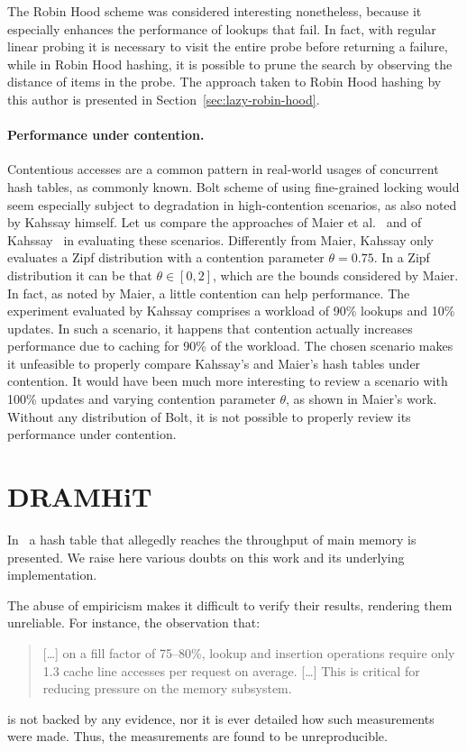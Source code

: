 The Robin Hood scheme was considered interesting nonetheless, because it especially enhances the performance of lookups that fail.
In fact, with regular linear probing it is necessary to visit the entire probe before returning a failure, while in Robin Hood hashing, it is possible to prune the search by observing the distance of items in the probe.
The approach taken to Robin Hood hashing by this author is presented in Section~\ref{sec:lazy-robin-hood}.

\paragraph{Performance under contention.}
Contentious accesses are a common pattern in real-world usages of concurrent hash tables, as commonly known.
Bolt scheme of using fine-grained locking would seem especially subject to degradation in high-contention scenarios, as also noted by Kahssay himself.
Let us compare the approaches of Maier et al.\ \cite[\S8.4, ``Performance under contention'']{maier} and of Kahssay~\cite[\S7.4]{bolt} in evaluating these scenarios.
Differently from Maier, Kahssay only evaluates a Zipf distribution with a contention parameter $\theta = 0.75$.
In a Zipf distribution it can be that $\theta \in [0, 2]$, which are the bounds considered by Maier.
In fact, as noted by Maier, a little contention can help performance.
The experiment evaluated by Kahssay comprises a workload of 90\% lookups and 10\% updates.
In such a scenario, it happens that contention actually increases performance due to caching for 90\% of the workload.
The chosen scenario makes it unfeasible to properly compare Kahssay's and Maier's hash tables under contention.
It would have been much more interesting to review a scenario with 100\% updates and varying contention parameter $\theta$, as shown in Maier's work.
Without any distribution of Bolt, it is not possible to properly review its performance under contention.


\section{DRAMHiT}\label{sec:dramhit}

In~\cite{dramhit} a hash table that allegedly reaches the throughput of main memory is presented.
We raise here various doubts on this work and its underlying implementation.

The abuse of empiricism makes it difficult to verify their results, rendering them unreliable.
For instance, the observation that:
\begin{quote}
	[\ldots] on a fill factor of 75--80\%, lookup and insertion operations require only 1.3 cache line accesses per request on average.
	[\ldots] This is critical for reducing pressure on the memory subsystem.
\end{quote}
is not backed by any evidence, nor it is ever detailed how such measurements were made.
Thus, the measurements are found to be unreproducible.

